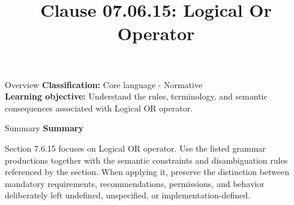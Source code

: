 \documentclass[10pt,letterpaper]{article}
\title{Clause 07.06.15: Logical Or Operator}
\author{}
\date{}
\begin{document}
\maketitle
\begin{CornellOverviewBox}{Overview}
\textbf{Classification:} Core language - Normative\\[2pt]
\textbf{Learning objective:} Understand the rules, terminology, and semantic consequences associated with Logical OR operator.
\end{CornellOverviewBox}\begin{CornellSummaryBox}{Summary}
{\sffamily\bfseries\color{Accent} Summary}\par\vspace{3pt}Section 7.6.15 focuses on Logical OR operator. Use the listed grammar productions together with the semantic constraints and disambiguation rules referenced by the section. When applying it, preserve the distinction between mandatory requirements, recommendations, permissions, and behavior deliberately left undefined, unspecified, or implementation-defined.
\end{CornellSummaryBox}
\end{document}

